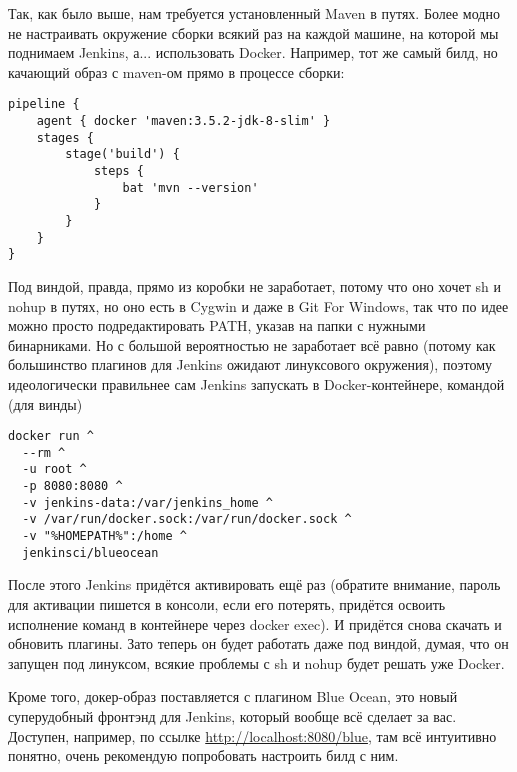 \documentclass[a5paper]{article}
\begin{document}
Так, как было выше, нам требуется установленный Maven в путях. Более модно не настраивать окружение сборки всякий раз на каждой машине, на которой мы поднимаем Jenkins, а... использовать Docker. Например, тот же
самый билд, но качающий образ с maven-ом прямо в процессе сборки:

\begin{verbatim}
pipeline {
    agent { docker 'maven:3.5.2-jdk-8-slim' }
    stages {
        stage('build') {
            steps {
                bat 'mvn --version'
            }
        }
    }
}
\end{verbatim}

Под виндой, правда, прямо из коробки не заработает, потому что оно хочет sh и nohup в путях, но оно есть в Cygwin и даже в Git For Windows, так что по идее можно просто подредактировать PATH, указав 
на папки с нужными бинарниками. Но с большой вероятностью не заработает всё равно (потому как большинство плагинов для Jenkins ожидают линуксового окружения), поэтому идеологически правильнее
сам Jenkins запускать в Docker-контейнере, командой (для винды)

\begin{verbatim}
docker run ^
  --rm ^
  -u root ^
  -p 8080:8080 ^
  -v jenkins-data:/var/jenkins_home ^
  -v /var/run/docker.sock:/var/run/docker.sock ^
  -v "%HOMEPATH%":/home ^
  jenkinsci/blueocean
\end{verbatim}

После этого Jenkins придётся активировать ещё раз (обратите внимание, пароль для активации пишется в консоли, если его потерять, придётся освоить исполнение команд в контейнере через docker exec). И придётся 
снова скачать и обновить плагины. Зато теперь он будет работать даже под виндой, думая, что он запущен под линуксом, всякие проблемы с sh и nohup будет решать уже Docker.

Кроме того, докер-образ поставляется с плагином Blue Ocean, это новый суперудобный фронтэнд для Jenkins, который вообще всё сделает за вас. Доступен, например, по ссылке \url{http://localhost:8080/blue}, там
всё интуитивно понятно, очень рекомендую попробовать настроить билд с ним.
\end{document}
